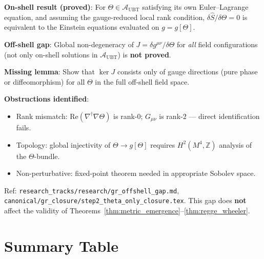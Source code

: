 \documentclass[12pt,a4paper]{article}
\theoremstyle{definition}
\theoremstyle{remark}
\newcommand{\Ltwo}{\textbf{[L2]}}
\newcommand{\OPEN}{\textbf{[OPEN]}}
\begin{document}
\begin{tcolorbox}[colback=red!5!white,colframe=red!60!black,
  title=Open Problem GAP-10: Off-shell $\Theta$-only closure \OPEN~\Ltwo]

\textbf{On-shell result (proved)}: For $\Theta \in \mathcal{A}_{\mathrm{UBT}}$
satisfying its own Euler--Lagrange equation, and assuming the gauge-reduced
local rank condition, $\delta\hat{S}/\delta\Theta = 0$ is equivalent to the
Einstein equations evaluated on $g = g[\Theta]$.

\medskip
\textbf{Off-shell gap}: Global non-degeneracy of $J = \delta g^{\mu\nu}/\delta\Theta$
for \emph{all} field configurations (not only on-shell solutions in
$\mathcal{A}_{\mathrm{UBT}}$) is \textbf{not proved}.

\medskip
\textbf{Missing lemma}: Show that $\ker J$ consists only of gauge directions
(pure phase or diffeomorphism) for all $\Theta$ in the full off-shell field space.

\medskip
\textbf{Obstructions identified}:
\begin{itemize}
  \item Rank mismatch: $\mathrm{Re}(\nabla^\dagger\nabla\Theta)$ is rank-0;
        $G_{\mu\nu}$ is rank-2 — direct identification fails.
  \item Topology: global injectivity of $\Theta\to g[\Theta]$ requires
        $H^2(M^4,\mathbb{Z})$ analysis of the $\Theta$-bundle.
  \item Non-perturbative: fixed-point theorem needed in appropriate Sobolev space.
\end{itemize}

\medskip
Ref: \texttt{research\_tracks/research/gr\_offshell\_gap.md},
\texttt{canonical/gr\_closure/step2\_theta\_only\_closure.tex}.
This gap does \textbf{not} affect the validity of Theorems~\ref{thm:metric_emergence}--\ref{thm:regge_wheeler}.
\end{tcolorbox}

\section{Summary Table}
\label{sec:summary}
\end{document}
